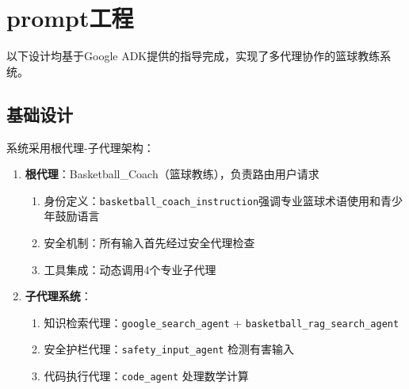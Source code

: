 \documentclass{article}
\theoremstyle{plain}
\newtheorem{theorem}{Theorem}[section]
\newtheorem{lemma}[theorem]{Lemma}
\newtheorem{corollary}[theorem]{Corollary}
\theoremstyle{definition}
\newtheorem{assumption}[theorem]{Assumption}
\theoremstyle{remark}
\newtheorem{remark}[theorem]{Remark}
\begin{document}







\section{prompt工程}
以下设计均基于Google ADK提供的指导完成，实现了多代理协作的篮球教练系统。

\subsection{基础设计}
系统采用根代理-子代理架构：
\begin{enumerate}
    \item \textbf{根代理}：Basketball\_Coach（篮球教练），负责路由用户请求
    \begin{enumerate}
        \item 身份定义：\texttt{basketball\_coach\_instruction}强调专业篮球术语使用和青少年鼓励语言
        \item 安全机制：所有输入首先经过安全代理检查
        \item 工具集成：动态调用4个专业子代理
    \end{enumerate}
    
    \item \textbf{子代理系统}：
    \begin{enumerate}
        \item 知识检索代理：\texttt{google\_search\_agent} + \texttt{basketball\_rag\_search\_agent}
        \item 安全护栏代理：\texttt{safety\_input\_agent} 检测有害输入
        \item 代码执行代理：\texttt{code\_agent} 处理数学计算
    \end{enumerate}
\end{enumerate}
\end{document}
